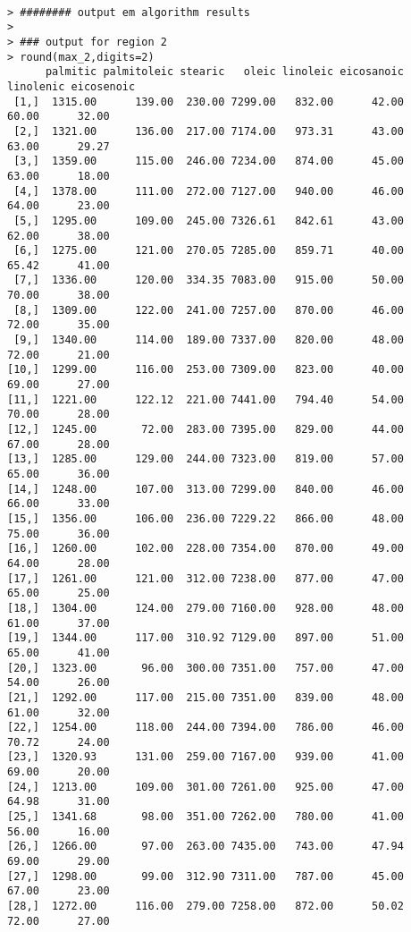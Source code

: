 \documentclass[11pt]{article}
\begin{document}
\begin{verbatim}

> ######## output em algorithm results
> 
> ### output for region 2
> round(max_2,digits=2)
      palmitic palmitoleic stearic   oleic linoleic eicosanoic linolenic eicosenoic
 [1,]  1315.00      139.00  230.00 7299.00   832.00      42.00     60.00      32.00
 [2,]  1321.00      136.00  217.00 7174.00   973.31      43.00     63.00      29.27
 [3,]  1359.00      115.00  246.00 7234.00   874.00      45.00     63.00      18.00
 [4,]  1378.00      111.00  272.00 7127.00   940.00      46.00     64.00      23.00
 [5,]  1295.00      109.00  245.00 7326.61   842.61      43.00     62.00      38.00
 [6,]  1275.00      121.00  270.05 7285.00   859.71      40.00     65.42      41.00
 [7,]  1336.00      120.00  334.35 7083.00   915.00      50.00     70.00      38.00
 [8,]  1309.00      122.00  241.00 7257.00   870.00      46.00     72.00      35.00
 [9,]  1340.00      114.00  189.00 7337.00   820.00      48.00     72.00      21.00
[10,]  1299.00      116.00  253.00 7309.00   823.00      40.00     69.00      27.00
[11,]  1221.00      122.12  221.00 7441.00   794.40      54.00     70.00      28.00
[12,]  1245.00       72.00  283.00 7395.00   829.00      44.00     67.00      28.00
[13,]  1285.00      129.00  244.00 7323.00   819.00      57.00     65.00      36.00
[14,]  1248.00      107.00  313.00 7299.00   840.00      46.00     66.00      33.00
[15,]  1356.00      106.00  236.00 7229.22   866.00      48.00     75.00      36.00
[16,]  1260.00      102.00  228.00 7354.00   870.00      49.00     64.00      28.00
[17,]  1261.00      121.00  312.00 7238.00   877.00      47.00     65.00      25.00
[18,]  1304.00      124.00  279.00 7160.00   928.00      48.00     61.00      37.00
[19,]  1344.00      117.00  310.92 7129.00   897.00      51.00     65.00      41.00
[20,]  1323.00       96.00  300.00 7351.00   757.00      47.00     54.00      26.00
[21,]  1292.00      117.00  215.00 7351.00   839.00      48.00     61.00      32.00
[22,]  1254.00      118.00  244.00 7394.00   786.00      46.00     70.72      24.00
[23,]  1320.93      131.00  259.00 7167.00   939.00      41.00     69.00      20.00
[24,]  1213.00      109.00  301.00 7261.00   925.00      47.00     64.98      31.00
[25,]  1341.68       98.00  351.00 7262.00   780.00      41.00     56.00      16.00
[26,]  1266.00       97.00  263.00 7435.00   743.00      47.94     69.00      29.00
[27,]  1298.00       99.00  312.90 7311.00   787.00      45.00     67.00      23.00
[28,]  1272.00      116.00  279.00 7258.00   872.00      50.02     72.00      27.00

\end{verbatim}
\end{document}
